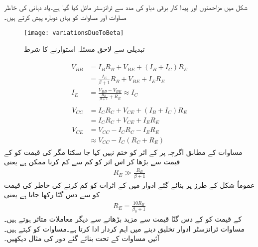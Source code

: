 شکل   میں مزاحمتوں اور پیدا کار برقی دباو کی مدد سے ٹرانزسٹر مائل کیا گیا ہے۔یاد دہانی کی خاطر مساوات   اور مساوات   کو یہاں دوبارہ پیش کرتے ہیں۔
\begin{figure}
\centering
\texttt{[image: variationsDueToBeta]}
\caption{تبدیلی  سے لاحق مسئلہ استوارنے کا شرط}
\label{شکل_تبدیلی_سے_لاحق_مسئلہ_استوارنے_کا_شرط}
\end{figure}
%
\begin{gather} \label{مساوات_ٹرانزسٹر_دور_بمع_تینوں_مزاحمت_کی_داخلی_جانب_الف}
\begin{aligned}
V_{BB} &=I_B R_B +V_{BE}+\left (I_B+I_C \right )R_E\\
&=\frac{I_E}{\beta+1} R_B +V_{BE}+I_E R_E\\
I_E&=\frac{V_{BB}-V_{BE}}{\frac{R_B}{\beta+1}+R_E} \approx I_C
\end{aligned}
\end{gather}
%
\begin{gather} \label{مساوات_ٹرانزسٹر_دور_بمع_تینوں_مزاحمت_کی_خارجی_جانب_الف}
\begin{aligned}
V_{CC} &=I_C R_C +V_{CE}+\left (I_B+I_C \right ) R_E \\
&=I_C R_C +V_{CE} +I_E R_E\\
V_{CE} &=V_{CC}-I_C R_C - I_E R_E\\
&\approx V_{CC}-I_C \left (R_C+R_E \right )
\end{aligned}
\end{gather}
مساوات   کے مطابق اگرچہ  پر  کے اثر کو ختم نہیں کیا جا سکتا مگر   کی قیمت کو  کے قیمت سے بڑھا کر اس اثر کو کم سے کم کرنا ممکن ہے یعنی
\begin{align}\label{مساوات_ٹرانزسٹر_مخارج_قابو_مزاحمت_کی_شرط_الف}
R_E \gg \frac{R_B}{\beta+1}
\end{align}
عموماً شکل   کے طرز پر بنائے گئے ادوار میں  کے اثرات کو کم کرنے کی خاطر  کی قیمت کو   سے دس گنّا رکھا جاتا ہے یعنی
\begin{align} \label{مساوات_ٹرانزسٹر_مخارج_قابو_مزاحمت_کی_شرح}
R_E = \frac{10 R_B}{\beta_0+1}
\end{align}
 کے قیمت کو  کے دس گنّا قیمت سے مزید بڑھانے سے دیگر معاملات متاثر ہوتے ہیں۔مساوات   ٹرانزسٹر ادوار تخلیق دینے میں اہم کردار ادا کرتا ہے۔مساوات   کو  کہتے ہیں۔آئیں مساوات   کے تحت بنائے گئے دور کی مثال دیکھیں۔

